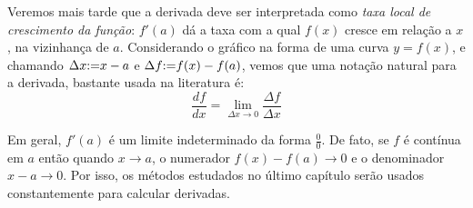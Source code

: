 \begin{wrapfigure}{r}{5cm}
\begin{center}
\begin{bmlimage}\end{bmlimage}
\end{center}
\end{wrapfigure}
Veremos mais tarde que a derivada deve ser interpretada como \emph{taxa local de
crescimento da função}: $f'(a)$ dá a taxa com a qual $f(x)$ cresce em relação a $x$, na
vizinhança de $a$. Considerando o gráfico na forma de uma curva $y=f(x)$, e
chamando $\Delta x{:=} x-a$ e $\Delta f{:=}
f(x)-f(a)$, vemos que uma notação natural para a derivada, bastante
usada na literatura é:
$${\frac{df}{dx}=\lim_{\Delta x\to
0}\frac{\Delta f}{\Delta x}}
$$

% 

\begin{obs}
Em geral, $f'(a)$ é um limite indeterminado da forma
$\frac00$. De fato, se $f$ é contínua em $a$ então quando $x\to a$,
o numerador $f(x)-f(a)\to 0$ e o denominador $x-a\to 0$.
Por isso, os métodos estudados no último capítulo serão usados constantemente
para calcular derivadas.
\end{obs}

